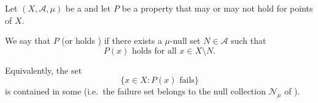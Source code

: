 \begin{definition} \label{definition:property_holds_almost_everywhere_for_a_measure_space}
Let $(X, \mathcal{A}, \mu)$ be a  and let $P$ be a property that may or may not hold for points of $X$.

We say that $P$  (or holds ) if there exists a $\mu$-null set $N \in \mathcal{A}$ such that
$$P(x) \text{ holds for all } x \in X \setminus N.$$

Equivalently, the set
$$\{ x \in X : P(x) \text{ fails} \}$$
is contained in some  (i.e.\ the failure set belongs to the null collection $\mathcal{N}_\mu$ of ).
\end{definition}
